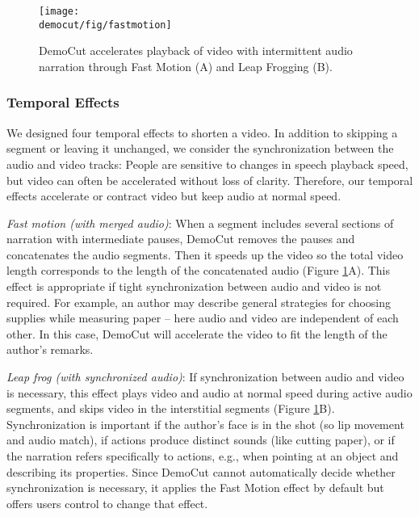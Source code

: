 \begin{figure}[b]
  \centering
\texttt{[image: \\democut/fig/fastmotion]}
  \caption{DemoCut accelerates playback of video with intermittent audio narration through Fast Motion (A) and Leap Frogging (B).}
  \label{fig:fastmotion}
\end{figure}

\subsubsection{Temporal Effects}
We designed four temporal effects to shorten a video. In addition to skipping a segment or leaving it unchanged, we consider the synchronization between the audio and video tracks: People are sensitive to changes in speech playback speed, but video can often be accelerated without loss of clarity. Therefore,
our temporal effects accelerate or contract video but keep audio at normal speed.

{\em Fast motion (with merged audio)}: When a segment includes several sections of narration with intermediate pauses, DemoCut removes the pauses and concatenates the audio segments. Then it speeds up the video so the total video length corresponds to the length of the concatenated audio (Figure \ref{fig:fastmotion}A). This effect is appropriate if tight synchronization between audio and video is not required. For example, an author may describe general strategies for choosing supplies while measuring paper -- here audio and video are independent of each other. In this case, DemoCut will accelerate the video %
to fit the length of the author's remarks.

{\em Leap frog (with synchronized audio)}: If synchronization between audio and video is necessary, this effect plays video and audio at normal speed during active audio segments, and skips video in the interstitial segments (Figure \ref{fig:fastmotion}B).
Synchronization is important if the author's face is in the shot (so lip movement and audio match), if actions produce distinct sounds (like cutting paper), or if the narration refers specifically to actions, e.g., when pointing at an object and describing its properties.
Since DemoCut cannot automatically decide whether synchronization is necessary,
it applies the Fast Motion effect by default but offers users control to change that effect.

